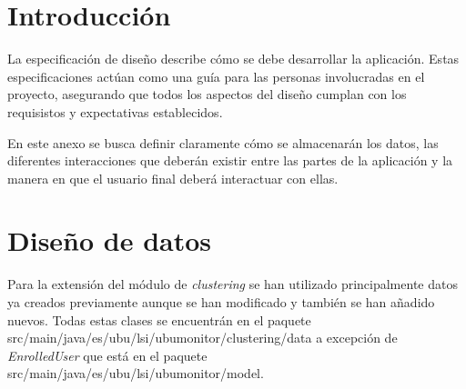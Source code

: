 
\section{Introducción}

La especificación de diseño describe cómo se debe desarrollar la aplicación. Estas especificaciones actúan como una guía para las personas involucradas en el proyecto, asegurando que todos los aspectos del diseño cumplan con los requisistos y expectativas establecidos.

En este anexo se busca definir claramente cómo se almacenarán los datos, las diferentes interacciones que deberán existir entre las partes de la aplicación y la manera en que el usuario final deberá interactuar con ellas.

\section{Diseño de datos}

Para la extensión del módulo de \emph{clustering} se han utilizado principalmente datos ya creados previamente aunque se han modificado y también se han añadido nuevos. Todas estas clases se encuentrán en el paquete src/main/java/es/ubu/lsi/ubumonitor/clustering/data a excepción de \emph{EnrolledUser} que está en el paquete src/main/java/es/ubu/lsi/ubumonitor/model.

